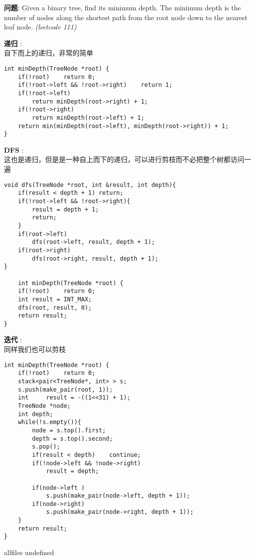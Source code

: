 \documentclass{article}
\begin{document}
\begin{CJK}{UTF8}{gbsn}     %

\else
    
\begin{description}
    \item{\textbf{问题}}: Given a binary tree, find its minimum depth. The minimum depth is the number of nodes along the shortest path from the root node down to the nearest leaf node. \textit{(leetcode 111)}
    \item{\textbf{递归}} : 
    \\自下而上的递归，非常的简单
    \begin{lstlisting}
int minDepth(TreeNode *root) {
    if(!root)    return 0;
    if(!root->left && !root->right)    return 1;
    if(!root->left)
        return minDepth(root->right) + 1;
    if(!root->right)
        return minDepth(root->left) + 1;
    return min(minDepth(root->left), minDepth(root->right)) + 1;
}
    \end{lstlisting}
    \item{\textbf{DFS}} : 
    \\这也是递归，但是是一种自上而下的递归，可以进行剪枝而不必把整个树都访问一遍
    \begin{lstlisting}
void dfs(TreeNode *root, int &result, int depth){
    if(result < depth + 1) return;
    if(!root->left && !root->right){
        result = depth + 1;
        return;
    }
    if(root->left)
        dfs(root->left, result, depth + 1);
    if(root->right)
        dfs(root->right, result, depth + 1);
}

    int minDepth(TreeNode *root) {
    if(!root)    return 0;
    int result = INT_MAX;
    dfs(root, result, 0);
    return result;
}
    \end{lstlisting}
    \item{\textbf{迭代}} : 
    \\同样我们也可以剪枝
    \begin{lstlisting}
int minDepth(TreeNode *root) {
    if(!root)    return 0;
    stack<pair<TreeNode*, int> > s;
    s.push(make_pair(root, 1));
    int     result = -((1<<31) + 1);
    TreeNode *node;
    int depth;
    while(!s.empty()){
        node = s.top().first;
        depth = s.top().second;
        s.pop();
        if(result < depth)    continue;
        if(!node->left && !node->right)
            result = depth;
    
        if(node->left )
            s.push(make_pair(node->left, depth + 1));
        if(node->right)
            s.push(make_pair(node->right, depth + 1));
    }
    return result;
}
    \end{lstlisting}
\end{description}

\fi

\ifx allfiles undefined
\end{CJK}
\end{document}
